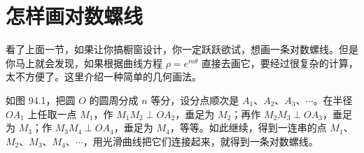 \section{怎样画对数螺线}

看了上面一节，如果让你搞橱窗设计，你一定跃跃欲试，想画一条对数螺线。但是你马上就会发现，如果根据曲线方程 $\rho = e^{m\theta}$ 直接去画它，要经过很复杂的计算，太不方便了。这里介绍一种简单的几何画法。

\par\medskip\noindent
\begin{minipage}[c]{0.49\textwidth}
  \hspace{2em}如图 94.1，把圆 $O$ 的圆周分成 $n$ 等分，设分点顺次是 $A_1$、$A_2$、$A_3$、$\cdots$。在半径 $OA_1$ 上任取一点 $M_1$，作 $M_1M_2 \perp OA_2$，垂足为 $M_2$；再作 $M_2M_3 \perp OA_3$，垂足为 $M_3$；作 $M_3M_4 \perp OA_4$，垂足为 $M_4$，等等。如此继续，得到一连串的点 $M_1$、$M_2$、$M_3$、$M_4$、$\cdots$，用光滑曲线把它们连接起来，就得到一条对数螺线。
\end{minipage}%
\hfill
